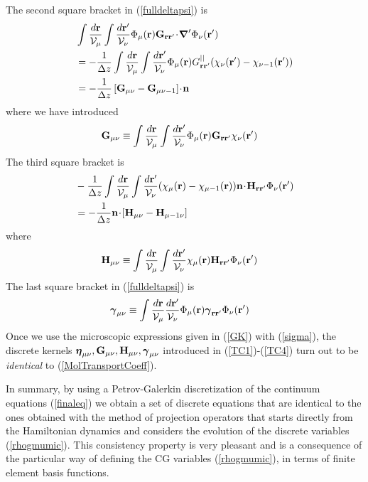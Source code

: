 \documentclass[b5paper,openright,11pt]{book}
\newcommand{\esc}{\!\cdot\!}
\begin{document}
The second square bracket in (\ref{fulldeltapsi}) is
\begin{align}
&\int \frac{d{\bf r}}{{\cal V}_\mu}\int \frac{d{\bf r}'}{{\cal V}_\nu}
\Phi_\mu({\bf r}){\bf G}_{{\bf r}{\bf r}'}\esc{\boldsymbol{\nabla}^\prime}\Phi_\nu({\bf r}')
\nonumber\\
&=-\frac{1}{\Delta z}\int \frac{d{\bf r}}{{\cal V}_\mu}\int \frac{d{\bf r}'}{{\cal V}_\nu}
\Phi_\mu({\bf r})G^{||}_{{\bf r}{\bf r}'}
(\chi_\nu({\bf r}')-\chi_{\nu-1}({\bf r}'))
\nonumber\\
&=-\frac{1}{\Delta z}\left[{\bf G}_{\mu\nu}-{\bf G}_{\mu\nu-1}\right]\esc{\bf n}
\label{TC4b}
\end{align}
where we have introduced
\begin{align}
{\bf G}_{\mu\nu}&\equiv \int \frac{d{\bf r}}{{\cal V}_\mu}\int \frac{d{\bf r}'}{{\cal V}_\nu}
\Phi_\mu({\bf r}){\bf G}_{{\bf r}{\bf r}'}
\chi_\nu({\bf r}')
\end{align}
The third square bracket is 
\begin{align}
&-\frac{1}{\Delta z}\int \frac{d{\bf r}}{{\cal V}_\mu}\int \frac{d{\bf r}'}{{\cal V}_\nu}
(\chi_\mu({\bf r})-\chi_{\mu-1}({\bf r})){\bf n}\esc
{\bf H}_{{\bf r}{\bf r}'}\Phi_\nu({\bf r}')
\nonumber\\
&=-\frac{1}{\Delta z}{\bf n}\esc\left[{\bf H}_{\mu\nu}-{\bf H}_{\mu-1\nu}\right]
\end{align}
where
\begin{align}
{\bf H}_{\mu\nu}&\equiv \int \frac{d{\bf r}}{{\cal V}_\mu}\int \frac{d{\bf r}'}{{\cal V}_\nu}
\chi_\mu({\bf r}){\bf H}_{{\bf r}{\bf r}'}
\Phi_\nu({\bf r}')
\label{TC4}
\end{align}
The last square bracket in (\ref{fulldeltapsi}) is
\begin{align}
\boldsymbol{\gamma}_{\mu\nu}&\equiv \int \frac{d{\bf r}}{{\cal V}_\mu} \frac{d{\bf r}'}{{\cal V}_\nu}
\Phi_\mu({\bf r})\boldsymbol{\gamma}_{{\bf r}{\bf r}'}\Phi_\nu({\bf r}')
\label{apgammmunu}
\end{align}
Once  we use  the  microscopic expressions  given  in (\ref{GK})  with
(\ref{sigma}), the discrete  kernels $\boldsymbol{\eta}_{\mu\nu}, {\bf
  G}_{\mu\nu},      {\bf     H}_{\mu\nu},\boldsymbol{\gamma}_{\mu\nu}$
introduced    in    (\ref{TC1})-(\ref{TC4})    turn    out    to    be
\textit{identical} to (\ref{MolTransportCoeff}). 

In summary, by using a Petrov-Galerkin discretization of the continuum
equations (\ref{finaleq}) we  obtain a set of  discrete equations that
are  identical to  the ones  obtained  with the  method of  projection
operators  that  starts directly  from  the  Hamiltonian dynamics  and
considers the  evolution of the discrete  variables (\ref{rhogmumic}).
This consistency property is very pleasant and is a consequence of the
particular  way of  defining  the CG  variables (\ref{rhogmumic}),  in
terms of finite element basis functions.
\end{document}
